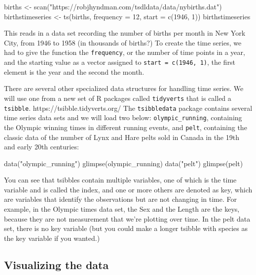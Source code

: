 \documentclass[
  letterpaper,
  DIV=11,
  numbers=noendperiod]{scrreprt}
\newenvironment{Shaded}{\begin{snugshade}}{\end{snugshade}}
\newcommand{\NormalTok}[1]{\textcolor[rgb]{0.00,0.23,0.31}{#1}}
\begin{document}
\begin{Shaded}
\begin{Highlighting}[]
\NormalTok{births \textless{}{-} scan("https://robjhyndman.com/tsdldata/data/nybirths.dat")}
\NormalTok{birthstimeseries \textless{}{-} ts(births, frequency = 12, start = c(1946, 1))}
\NormalTok{birthstimeseries}
\end{Highlighting}
\end{Shaded}

This reads in a data set recording the number of births per month in New
York City, from 1946 to 1958 (in thousands of births?) To create the
time series, we had to give the function the \texttt{frequency}, or the
number of time points in a year, and the starting value as a vector
assigned to \texttt{start\ =\ c(1946,\ 1)}, the first element is the
year and the second the month.

There are several other specialized data structures for handling time
series. We will use one from a new set of R packages called
\texttt{tidyverts} that is called a \texttt{tsibble}.
https://tsibble.tidyverts.org/ The \texttt{tsibbledata} package contains
several time series data sets and we will load two below:
\texttt{olympic\_running}, containing the Olympic winning times in
different running events, and \texttt{pelt}, containing the classic data
of the number of Lynx and Hare pelts sold in Canada in the 19th and
early 20th centuries:

\begin{Shaded}
\begin{Highlighting}[]
\NormalTok{data("olympic\_running")}
\NormalTok{glimpse(olympic\_running)}
\NormalTok{data("pelt")}
\NormalTok{glimpse(pelt)}
\end{Highlighting}
\end{Shaded}

You can see that tsibbles contain multiple variables, one of which is
the time variable and is called the index, and one or more others are
denoted as key, which are variables that identify the observations but
are not changing in time. For example, in the Olympic times data set,
the Sex and the Length are the keys, because they are not measurement
that we're plotting over time. In the pelt data set, there is no key
variable (but you could make a longer tsibble with species as the key
variable if you wanted.)

\subsection{Visualizing the data}\label{visualizing-the-data}
\end{document}
